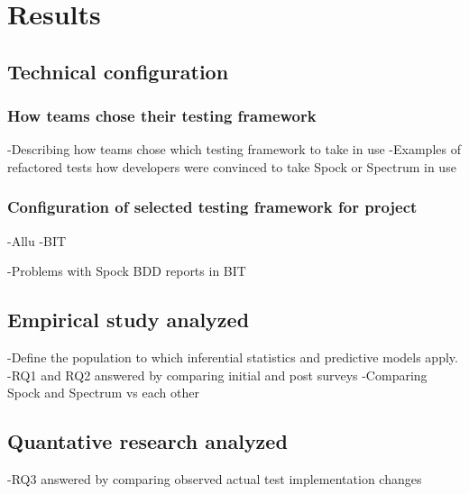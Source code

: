 \chapter{Results}
\label{chapter:Results}

\section{Technical configuration}
\subsection{How teams chose their testing framework}
    -Describing how teams chose which testing framework to take in use\newline
    -Examples of refactored tests how developers were convinced to take Spock or Spectrum in use\newline
\subsection{Configuration of selected testing framework for project}
    -Allu\newline
    -BIT

    -Problems with Spock BDD reports in BIT\newline


\section{Empirical study analyzed}
-Define the population to which inferential statistics and predictive models apply.\newline
-RQ1 and RQ2 answered by comparing initial and post surveys\newline
-Comparing Spock and Spectrum vs each other\newline

\section{Quantative research analyzed}
-RQ3 answered by comparing observed actual test implementation changes\newline

